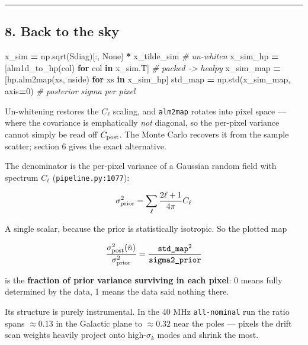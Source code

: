 \documentclass[
  11pt,
]{article}
\newenvironment{Shaded}{\begin{snugshade}}{\end{snugshade}}
\newcommand{\CommentTok}[1]{\textcolor[rgb]{0.56,0.35,0.01}{\textit{#1}}}
\newcommand{\ControlFlowTok}[1]{\textcolor[rgb]{0.13,0.29,0.53}{\textbf{#1}}}
\newcommand{\DecValTok}[1]{\textcolor[rgb]{0.00,0.00,0.81}{#1}}
\newcommand{\KeywordTok}[1]{\textcolor[rgb]{0.13,0.29,0.53}{\textbf{#1}}}
\newcommand{\NormalTok}[1]{#1}
\newcommand{\OperatorTok}[1]{\textcolor[rgb]{0.81,0.36,0.00}{\textbf{#1}}}
\newcommand{\VariableTok}[1]{\textcolor[rgb]{0.00,0.00,0.00}{#1}}
\begin{document}
\begin{center}\rule{0.5\linewidth}{0.5pt}\end{center}

\hypertarget{8-back-to-the-sky}{%
\subsection{8. Back to the sky}\label{8-back-to-the-sky}}

\begin{Shaded}
\begin{Highlighting}[]
\NormalTok{x\_sim     }\OperatorTok{=}\NormalTok{ np.sqrt(Sdiag)[:, }\VariableTok{None}\NormalTok{] }\OperatorTok{*}\NormalTok{ x\_tilde\_sim   }\CommentTok{\# un{-}whiten}
\NormalTok{x\_sim\_hp  }\OperatorTok{=}\NormalTok{ [alm1d\_to\_hp(col) }\ControlFlowTok{for}\NormalTok{ col }\KeywordTok{in}\NormalTok{ x\_sim.T]   }\CommentTok{\# packed {-}\textgreater{} healpy}
\NormalTok{x\_sim\_map }\OperatorTok{=}\NormalTok{ [hp.alm2map(xs, nside) }\ControlFlowTok{for}\NormalTok{ xs }\KeywordTok{in}\NormalTok{ x\_sim\_hp]}
\NormalTok{std\_map   }\OperatorTok{=}\NormalTok{ np.std(x\_sim\_map, axis}\OperatorTok{=}\DecValTok{0}\NormalTok{)               }\CommentTok{\# posterior sigma per pixel}
\end{Highlighting}
\end{Shaded}

Un-whitening restores the \(C_\ell\) scaling, and \texttt{alm2map}
rotates into pixel space --- where the covariance is emphatically
\emph{not} diagonal, so the per-pixel variance cannot simply be read off
\(C_{\rm post}\). The Monte Carlo recovers it from the sample scatter;
section 6 gives the exact alternative.

The denominator is the per-pixel variance of a Gaussian random field
with spectrum \(C_\ell\) (\texttt{pipeline.py:1077}):

\[ \sigma^2_{\rm prior} = \sum_\ell \frac{2\ell+1}{4\pi} C_\ell \]

A single scalar, because the prior is statistically isotropic. So the
plotted map

\[ \frac{\sigma^2_{\rm post}(\hat{n})}{\sigma^2_{\rm prior}} = \frac{\texttt{std\_map}^2}{\texttt{sigma2\_prior}} \]

is the \textbf{fraction of prior variance surviving in each pixel}: 0
means fully determined by the data, 1 means the data said nothing there.

Its structure is purely instrumental. In the 40 MHz \texttt{all-nominal}
run the ratio spans \(\approx 0.13\) in the Galactic plane to
\(\approx 0.32\) near the poles --- pixels the drift scan weights
heavily project onto high-\(\sigma_k\) modes and shrink the most.
\end{document}
